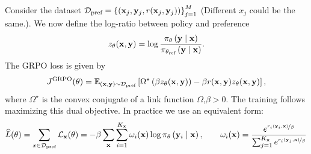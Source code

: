 \documentclass[11pt]{article}  %
\begin{document}
Consider the dataset $\mathcal{D}_{\text{pref}} = \left\{ (\mathbf{x}_j, \mathbf{y}_j, r(\mathbf{x}_j, \mathbf{y}_j)) \right\}_{j=1}^M$ (Different $x_j$ could be the same.).
We now define the log-ratio between policy and preference 
\begin{align*}
  z_\theta(\mathbf{x}, \mathbf{y}) = \log \frac{\pi_{\theta}\left( \mathbf{y} \mid \mathbf{x} \right)}{\pi_{\theta_{\text{ref}}}\left( \mathbf{y} \mid \mathbf{x} \right)}.
\end{align*}
The GRPO loss is given by 
\begin{align*}
  J^{\text{GRPO}}(\theta) = \mathbb{E}_{\left( \mathbf{x}, \mathbf{y} \right) \sim \mathcal{D}_{\text{pref}}}\left[\Omega^\star\left( \beta z_\theta(\mathbf{x}, \mathbf{y}) \right) - \beta r(\mathbf{x}, \mathbf{y})z_{\theta}(\mathbf{x}, \mathbf{y})\right],
\end{align*}
where $\Omega^\star$ is the convex conjugate of a link function $\Omega$,$\beta > 0$.
The training follows maximizing this dual objective.
In practice we use an equivalent form:
\begin{align*}
  \widehat{L}(\theta) = \sum_{x \in \mathcal{D}_{\text{pref}}} \mathcal{L}_{\mathbf{x}}(\theta) = -\beta \sum_{\mathbf{x}} \sum_{i=1}^{K_{\mathbf{x}}} \omega_i(\mathbf{x})\log \pi_{\theta}\left( \mathbf{y}_i \mid \mathbf{x} \right), \qquad \omega_i(\mathbf{x}) = \frac{e^{\nicefrac{r_i(\mathbf{y}_i, \mathbf{x})}{\beta}}}{\sum_{j=1}^{K_{\mathbf{x}}}e^{\nicefrac{r_i(\mathbf{y}_j, \mathbf{x})}{\beta}}}
\end{align*}
\end{document}
